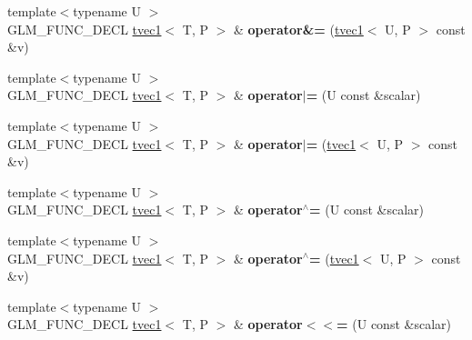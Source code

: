 \begin{DoxyCompactItemize}
\item 
\hypertarget{structglm_1_1tvec1_a672c44812f4806e389fd1ec24466b0d8}{{\footnotesize template$<$typename U $>$ }\\G\-L\-M\-\_\-\-F\-U\-N\-C\-\_\-\-D\-E\-C\-L \hyperlink{structglm_1_1tvec1}{tvec1}$<$ T, P $>$ \& {\bfseries operator\&=} (\hyperlink{structglm_1_1tvec1}{tvec1}$<$ U, P $>$ const \&v)}\label{structglm_1_1tvec1_a672c44812f4806e389fd1ec24466b0d8}

\item 
\hypertarget{structglm_1_1tvec1_ae99e6062735581a8a2cf6f1cf493e4a9}{{\footnotesize template$<$typename U $>$ }\\G\-L\-M\-\_\-\-F\-U\-N\-C\-\_\-\-D\-E\-C\-L \hyperlink{structglm_1_1tvec1}{tvec1}$<$ T, P $>$ \& {\bfseries operator$\vert$=} (U const \&scalar)}\label{structglm_1_1tvec1_ae99e6062735581a8a2cf6f1cf493e4a9}

\item 
\hypertarget{structglm_1_1tvec1_a6c8723729c52dbf1511bb50723f686c0}{{\footnotesize template$<$typename U $>$ }\\G\-L\-M\-\_\-\-F\-U\-N\-C\-\_\-\-D\-E\-C\-L \hyperlink{structglm_1_1tvec1}{tvec1}$<$ T, P $>$ \& {\bfseries operator$\vert$=} (\hyperlink{structglm_1_1tvec1}{tvec1}$<$ U, P $>$ const \&v)}\label{structglm_1_1tvec1_a6c8723729c52dbf1511bb50723f686c0}

\item 
\hypertarget{structglm_1_1tvec1_a0d654820b17e506cf59cd7cbddae8180}{{\footnotesize template$<$typename U $>$ }\\G\-L\-M\-\_\-\-F\-U\-N\-C\-\_\-\-D\-E\-C\-L \hyperlink{structglm_1_1tvec1}{tvec1}$<$ T, P $>$ \& {\bfseries operator$^\wedge$=} (U const \&scalar)}\label{structglm_1_1tvec1_a0d654820b17e506cf59cd7cbddae8180}

\item 
\hypertarget{structglm_1_1tvec1_abc6f6df2f1164cb293976e0418e44690}{{\footnotesize template$<$typename U $>$ }\\G\-L\-M\-\_\-\-F\-U\-N\-C\-\_\-\-D\-E\-C\-L \hyperlink{structglm_1_1tvec1}{tvec1}$<$ T, P $>$ \& {\bfseries operator$^\wedge$=} (\hyperlink{structglm_1_1tvec1}{tvec1}$<$ U, P $>$ const \&v)}\label{structglm_1_1tvec1_abc6f6df2f1164cb293976e0418e44690}

\item 
\hypertarget{structglm_1_1tvec1_a123d1e61ce02a35c23d22d956e774f32}{{\footnotesize template$<$typename U $>$ }\\G\-L\-M\-\_\-\-F\-U\-N\-C\-\_\-\-D\-E\-C\-L \hyperlink{structglm_1_1tvec1}{tvec1}$<$ T, P $>$ \& {\bfseries operator$<$$<$=} (U const \&scalar)}\label{structglm_1_1tvec1_a123d1e61ce02a35c23d22d956e774f32}


\end{DoxyCompactItemize}
